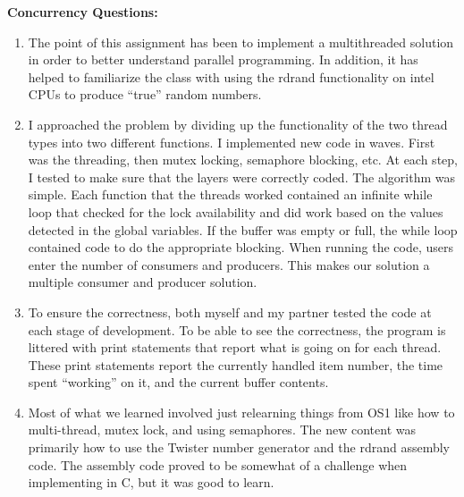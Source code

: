 \documentclass[letterpaper,10pt,fleqn]{article}
\begin{document}
\textbf{Concurrency Questions:}
\begin{enumerate}
	\item The point of this assignment has been to implement a multithreaded solution in order to better understand parallel programming. In addition, it has helped to familiarize the class with using the rdrand functionality on intel CPUs to produce “true” random numbers.
	\item I approached the problem by dividing up the functionality of the two thread types into two different functions. I implemented new code in waves. First was the threading, then mutex locking, semaphore blocking, etc. At each step, I tested to make sure that the layers were correctly coded. The algorithm was simple. Each function that the threads worked contained an infinite while loop that checked for the lock availability and did work based on the values detected in the global variables. If the buffer was empty or full, the while loop contained code to do the appropriate blocking. When running the code, users enter the number of consumers and producers. This makes our solution a multiple consumer and producer solution.
	\item To ensure the correctness, both myself and my partner tested the code at each stage of development. To be able to see the correctness, the program is littered with print statements that report what is going on for each thread. These print statements report the currently handled item number, the time spent “working” on it, and the current buffer contents.
	\item Most of what we learned involved just relearning things from OS1 like how to multi-thread, mutex lock, and using semaphores. The new content was primarily how to use the Twister number generator and the rdrand assembly code. The assembly code proved to be somewhat of a challenge when implementing in C, but it was good to learn.
\end{enumerate}
\end{document}
